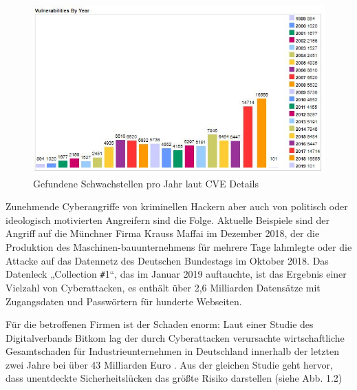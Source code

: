 \documentclass[12pt,oneside,a4paper,parskip]{scrbook}
\begin{document}
\begin{figure}[htb!]
  \centering
    \includegraphics[width=1\textwidth]{Images/VulnByYear}
  \caption[Gefundene Schwachstellen pro Jahr laut CVE Details]{Gefundene Schwachstellen pro Jahr laut CVE Details \cite{cve}}
  \end{figure}
Zunehmende Cyberangriffe von kriminellen Hackern aber auch von politisch oder ideologisch motivierten Angreifern sind die Folge. Aktuelle Beispiele sind der Angriff auf die Münchner Firma Krauss Maffai im Dezember 2018, der die Produktion des Maschinen-bauunternehmens für mehrere Tage lahmlegte oder die Attacke auf das Datennetz des Deutschen Bundestags im Oktober 2018. Das Datenleck „Collection \texttt{\#}1“, das im Januar 2019 auftauchte, ist das Ergebnis einer Vielzahl von Cyberattacken, es enthält über 2,6 Milliarden Datensätze mit Zugangsdaten und Passwörtern für hunderte Webseiten.

Für die betroffenen Firmen ist der Schaden enorm: Laut einer Studie des Digitalverbands Bitkom lag der durch Cyberattacken verursachte wirtschaftliche Gesamtschaden für Industrieunternehmen in Deutschland innerhalb der letzten zwei Jahre bei über 43 Milliarden Euro \cite{Bitkom}. Aus der gleichen Studie geht hervor, dass unentdeckte Sicherheitslücken das größte Risiko darstellen (siehe Abb. 1.2)
\end{document}
